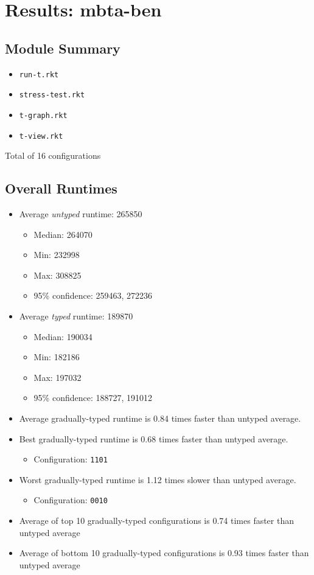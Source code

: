\documentclass{article}
\newcommand{\mono}[1]{\texttt{#1}}
\begin{document}
\section{Results: mbta-ben}

\subsection{Module Summary}
\begin{itemize}
\item \mono{run-t.rkt}
\item \mono{stress-test.rkt}
\item \mono{t-graph.rkt}
\item \mono{t-view.rkt}\end{itemize}
Total of 16 configurations

\subsection{Overall Runtimes}
\begin{itemize}
\item Average \emph{untyped} runtime: 265850
  \begin{itemize}
  \item Median: 264070
  \item Min: 232998
  \item Max: 308825
  \item 95\% confidence: 259463, 272236
  \end{itemize}
\item Average \emph{typed} runtime: 189870
  \begin{itemize}
  \item Median: 190034
  \item Min: 182186
  \item Max: 197032
  \item 95\% confidence: 188727, 191012
  \end{itemize}
\item Average gradually-typed runtime is 0.84 times faster than untyped average.
\item Best gradually-typed runtime is 0.68 times faster than untyped average.
\begin{itemize}\item Configuration: \mono{1101}\end{itemize}
\item Worst gradually-typed runtime is 1.12 times slower than untyped average.
\begin{itemize}\item Configuration: \mono{0010}\end{itemize}
\item Average of top 10 gradually-typed configurations is 0.74 times faster than untyped average
\item Average of bottom 10 gradually-typed configurations is 0.93 times faster than untyped average
\end{itemize}
\end{document}
